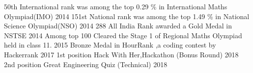 \begin{cvhonors}
  \cvhonor
    {50th International rank}
    {was among the top 0.29 \% in International Maths Olympiad(IMO)}
    {}
    {2014} 
  \cvhonor
    {151st National rank}
    {was among the top 1.49 \% in National Science Olympiad(NSO)}
    {}
    {2014}
  \cvhonor
    {288 All India Rank}
    {awarded a Gold Medal in NSTSE}
    {}
    {2014}
  \cvhonor
    {Among top 100 }
    {Cleared the Stage 1 of Regional Maths Olympiad held in class 11.}
    {}
    {2015}
  \cvhonor
  {Bronze Medal}
  {in HourRank ,a coding contest by Hackerrank}
  {}
  {2017}
  \cvhonor
  {1st position}
  {Hack With Her,Hackathon (Bonus Round)}
  {}
  {2018}
  \cvhonor
  {2nd position}
  {Great Engineering Quiz (Technical)}
  {}
  {2018}
\end{cvhonors}
